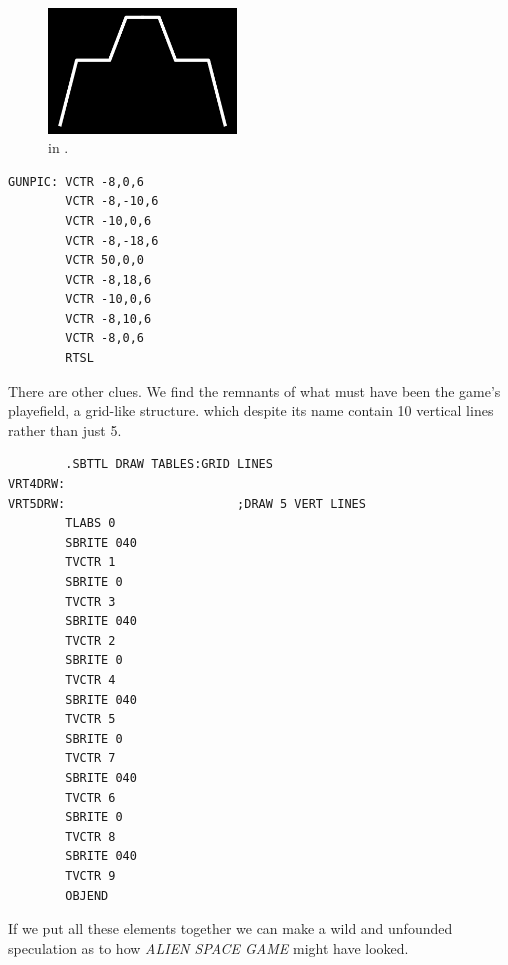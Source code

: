 \begin{minipage}[c]{0.48\linewidth}
\begin{figure}[H]
    \centering
    \begin{adjustbox}{width=4.5cm,center}
        \includegraphics[width=5cm]{src/recreation/GUN.png}%
    \end{adjustbox}
  \caption*{ in .}
\end{figure}
\end{minipage}
\begin{minipage}[c]{0.48\linewidth}
\begin{lstlisting}
GUNPIC: VCTR -8,0,6
        VCTR -8,-10,6
        VCTR -10,0,6
        VCTR -8,-18,6
        VCTR 50,0,0
        VCTR -8,18,6
        VCTR -10,0,6
        VCTR -8,10,6
        VCTR -8,0,6
        RTSL
\end{lstlisting}
\vspace*{\fill}
\end{minipage}

There are other clues. We find the remnants of what must have been the game's playefield, a grid-like
structure. which despite its name contain 10 vertical lines rather than just 5.
\begin{lstlisting}
        .SBTTL DRAW TABLES:GRID LINES
VRT4DRW:
VRT5DRW:                        ;DRAW 5 VERT LINES
        TLABS 0
        SBRITE 040
        TVCTR 1
        SBRITE 0
        TVCTR 3
        SBRITE 040
        TVCTR 2
        SBRITE 0
        TVCTR 4
        SBRITE 040
        TVCTR 5
        SBRITE 0
        TVCTR 7
        SBRITE 040
        TVCTR 6
        SBRITE 0
        TVCTR 8
        SBRITE 040
        TVCTR 9
        OBJEND
\end{lstlisting}
If we put all these elements together we can make a wild and unfounded speculation as to how
\textit{ALIEN SPACE GAME} might have looked. 

